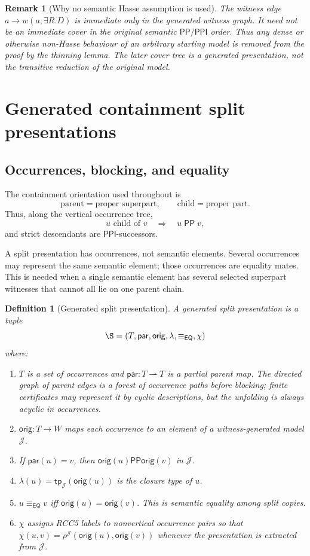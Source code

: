 \documentclass[11pt]{article}
\newtheorem{definition}[theorem]{Definition}
\newtheorem{remark}[theorem]{Remark}
\newcommand{\EQ}{\mathsf{EQ}}
\newcommand{\PP}{\mathsf{PP}}
\newcommand{\PPI}{\mathsf{PPI}}
\newcommand{\J}{\mathcal J}
\newcommand{\parr}{\mathsf{par}}
\newcommand{\orig}{\mathsf{orig}}
\newcommand{\tp}{\mathsf{tp}}
\newcommand{\eqc}{\equiv_{\EQ}}
\begin{document}
\begin{remark}[Why no semantic Hasse assumption is used]
The witness edge $a\to w(a,\exists R.D)$ is immediate only in the generated witness graph.  It need not be an immediate cover in the original semantic $\PP/\PPI$ order.  Thus any dense or otherwise non-Hasse behaviour of an arbitrary starting model is removed from the proof by the thinning lemma.  The later cover tree is a generated presentation, not the transitive reduction of the original model.
\end{remark}

\section{Generated containment split presentations}

\subsection{Occurrences, blocking, and equality}

The containment orientation used throughout is
\[
  \text{parent} = \text{proper superpart},
  \qquad
  \text{child} = \text{proper part}.
\]
Thus, along the vertical occurrence tree,
\[
  u \text{ child of } v \quad\Rightarrow\quad u\;\PP\;v,
\]
and strict descendants are $\PPI$-successors.

A split presentation has occurrences, not semantic elements.  Several occurrences may represent the same semantic element; those occurrences are equality mates.  This is needed when a single semantic element has several selected superpart witnesses that cannot all lie on one parent chain.

\begin{definition}[Generated split presentation]
A generated split presentation is a tuple
\[
  \S=(T,\parr,\orig,\lambda,\eqc,\chi)
\]
where:
\begin{enumerate}[label=(S\arabic*)]
\item $T$ is a set of occurrences and $\parr:T\rightharpoonup T$ is a partial parent map.  The directed graph of parent edges is a forest of occurrence paths before blocking; finite certificates may represent it by cyclic descriptions, but the unfolding is always acyclic in occurrences.
\item $\orig:T\to W$ maps each occurrence to an element of a witness-generated model $\J$.
\item If $\parr(u)=v$, then $\orig(u)\PP\orig(v)$ in $\J$.
\item $\lambda(u)=\tp_\J(\orig(u))$ is the closure type of $u$.
\item $u\eqc v$ iff $\orig(u)=\orig(v)$.  This is semantic equality among split copies.
\item $\chi$ assigns RCC5 labels to nonvertical occurrence pairs so that $\chi(u,v)=\rho^\J(\orig(u),\orig(v))$ whenever the presentation is extracted from $\J$.
\end{enumerate}
\end{definition}
\end{document}
